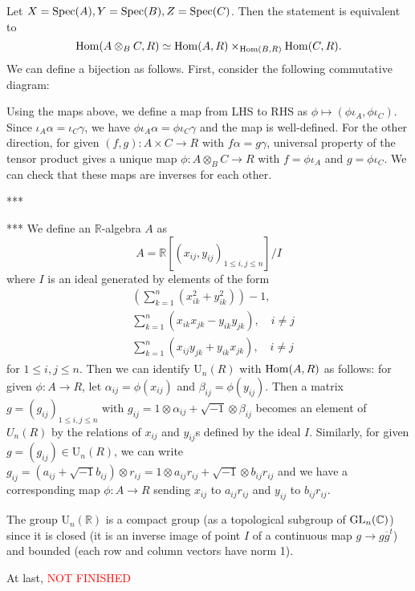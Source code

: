 \begin{problem}
Let $X = \operatorname{\mathrm{Spec}}(A), Y = \operatorname{\mathrm{Spec}}(B), Z = \operatorname{\mathrm{Spec}}(C)$. Then the statement is equivalent to
$$
    \operatorname{\mathrm{Hom}}(A \otimes_{B}C, R) \simeq \operatorname{\mathrm{Hom}}(A, R) \times_{\operatorname{\mathrm{Hom}}(B, R)} \operatorname{\mathrm{Hom}}(C, R).
$$
We can define a bijection as follows. First, consider the following commutative diagram:
\begin{center}
\end{center}
Using the maps above, we define a map from LHS to RHS as $\phi \mapsto (\phi \iota_{A}, \phi\iota_{C})$.
Since $\iota_{A}\alpha = \iota_{C}\gamma$, we have $\phi\iota_{A}\alpha = \phi\iota_{C}\gamma$ and the
map is well-defined.
For the other direction, for given $(f, g): A\times C \to R$ with $f\alpha = g \gamma$, universal property of the tensor product
gives a unique map $\phi: A\otimes_{B} C \to R$ with $f = \phi\iota_{A}$ and $g = \phi\iota_{C}$.
We can check that these maps are inverses for each other.
\end{problem}

\begin{problem} ***
\end{problem}

\begin{problem} ***
We define an $\mathbb{R}$-algebra $A$ as
$$
    A = \mathbb{R}[(x_{ij}, y_{ij})_{1 \leq i, j \leq n}] / I
$$
where $I$ is an ideal generated by elements of the form
\begin{align*}
    &\left(\sum_{k=1}^{n} (x_{ik}^{2} + y_{ik}^{2}) \right) - 1, \\
    &\sum_{k=1}^{n} (x_{ik}x_{jk} - y_{ik}y_{jk}), \quad i \neq j \\
    &\sum_{k=1}^{n} (x_{ij}y_{jk} + y_{ik}x_{jk}), \quad i \neq j
\end{align*}
for $1\leq i, j \leq n$.
Then we can identify $\mathrm{U}_{n}(R)$ with $\operatorname{\mathrm{Hom}}(A, R)$ as follows: for given $\phi : A \to R$,
let $\alpha_{ij} = \phi(x_{ij})$ and $\beta_{ij} = \phi(y_{ij})$.
Then a matrix $g = (g_{ij})_{1\leq i, j \leq n}$ with $g_{ij} = 1 \otimes \alpha_{ij} + \sqrt{-1} \otimes \beta_{ij}$ becomes an element
of $U_{n}(R)$ by the relations of $x_{ij}$ and $y_{ij}$s defined by the ideal $I$.
Similarly, for given $g = (g_{ij}) \in \mathrm{U}_{n}(R)$, we can write $g_{ij} = (a_{ij} + \sqrt{-1}b_{ij}) \otimes r_{ij} = 1 \otimes a_{ij}r_{ij} + \sqrt{-1} \otimes b_{ij}r_{ij}$
and we have a corresponding map $\phi : A \to R$ sending $x_{ij}$ to $a_{ij}r_{ij}$ and $y_{ij}$ to $b_{ij}r_{ij}$.

The group $\mathrm{U}_n(\mathbb{R})$ is a compact group (as a topological subgroup of $\operatorname{\mathrm{GL}}_{n}(\mathbb{C})$)
since it is closed (it is an inverse image of point $I$ of a continuous map $g \to g \overline{g}^{t}$) and bounded (each row and column vectors have norm 1).

At last, \textcolor{red}{NOT FINISHED}
\end{problem}

